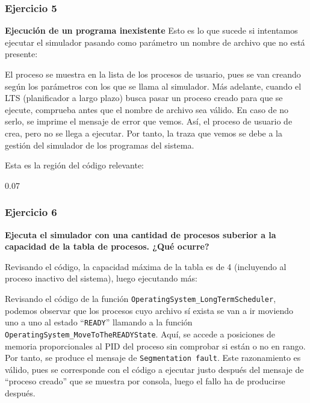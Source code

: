 \documentclass[12pt,a4paper]{article}
\newcounter{unit}[section]
\newcounter{chapter}[unit]
\renewcommand{\thechapter}{\arabic{chapter}}
\renewcommand{\thesubsubsection}{\thechapter.\arabic{subsubsection}}
\newcommand{\result}[1]{%
  \subsubsection{#1}%
  \label{result:\thesubsubsection}
}
\begin{document}
\vspace{6mm}
\result{Ejercicio 5}
\textbf{Ejecución de un programa inexistente}
\vspace{2mm}
Esto es lo que sucede si intentamos ejecutar el simulador pasando como parámetro un nombre de archivo que no está presente:
\begin{terminal}

\end{terminal}
El proceso se muestra en la lista de los procesos de usuario, pues se van creando según los parámetros con los que se llama al simulador. Más adelante, cuando el LTS (planificador a largo plazo) busca pasar un proceso creado para que se ejecute, comprueba antes que el nombre de archivo sea válido. En caso de no serlo, se imprime el mensaje de error que vemos. Así, el proceso de usuario de crea, pero no se llega a ejecutar. Por tanto, la traza que vemos se debe a la gestión del simulador de los programas del sistema.

\vspace{4mm} \noindent
Esta es la región del código relevante:
\vspace{2mm}
\begin{adjustwidth}{0.07\textwidth}{}
  
\end{adjustwidth}

\vspace{6mm}
\result{Ejercicio 6}
\textbf{Ejecuta el simulador con una cantidad de procesos suberior a la capacidad de la tabla de procesos. ¿Qué ocurre?}

\vspace{2mm} 
Revisando el código, la capacidad máxima de la tabla es de 4 (incluyendo al proceso inactivo del sistema), luego ejecutando más:
\begin{terminal}

\end{terminal}

Revisando el código de la función \texttt{OperatingSystem\_LongTermScheduler}, podemos observar que los procesos cuyo archivo sí exista se van a ir moviendo uno a uno al estado ``\texttt{READY}'' llamando a la función \texttt{OperatingSystem\_MoveToTheREADYState}. Aquí, se accede a posiciones de memoria proporcionales al PID del proceso sin comprobar si están o no en rango. Por tanto, se produce el mensaje de \texttt{Segmentation fault}. Este razonamiento es válido, pues se corresponde con el código a ejecutar justo después del mensaje de ``proceso creado'' que se muestra por consola, luego el fallo ha de producirse después.
\end{document}
